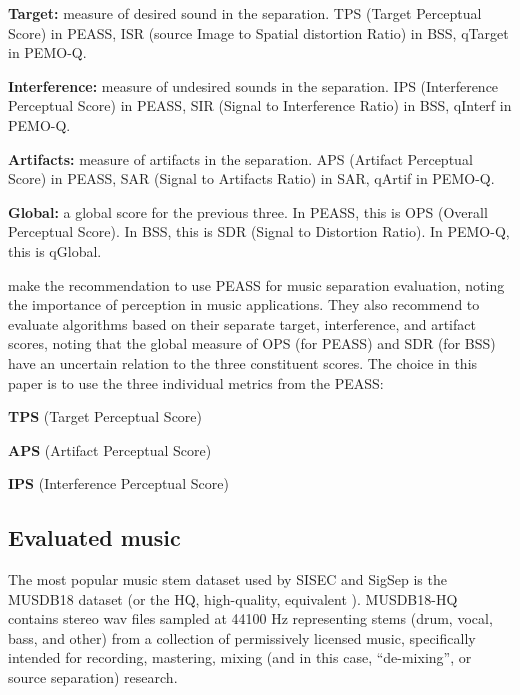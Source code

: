 \documentclass[letter,12pt]{article}
\newenvironment{tight_enumerate}{
\begin{enumerate}
  \setlength{\itemsep}{0pt}
  \setlength{\parskip}{0pt}
}{\end{enumerate}}
\newenvironment{tight_itemize}{
\begin{itemize}
  \setlength{\itemsep}{0pt}
  \setlength{\parskip}{0pt}
}{\end{itemize}}
\begin{document}
\begin{tight_itemize}
\item
	\textbf{Target:} measure of desired sound in the separation. TPS (Target Perceptual Score) in PEASS, ISR (source Image to Spatial distortion Ratio) in BSS, qTarget in PEMO-Q.
\item
	\textbf{Interference:} measure of undesired sounds in the separation. IPS (Interference Perceptual Score) in PEASS, SIR (Signal to Interference Ratio) in BSS, qInterf in PEMO-Q.
\item
	\textbf{Artifacts:} measure of artifacts in the separation. APS (Artifact Perceptual Score) in PEASS, SAR (Signal to Artifacts Ratio) in SAR, qArtif in PEMO-Q.
\item
	\textbf{Global:} a global score for the previous three. In PEASS, this is OPS (Overall Perceptual Score). In BSS, this is SDR (Signal to Distortion Ratio). In PEMO-Q, this is qGlobal.
\end{tight_itemize}

\citet{beassvpeass} make the recommendation to use PEASS for music separation evaluation, noting the importance of perception in music applications. They also recommend to evaluate algorithms based on their separate target, interference, and artifact scores, noting that the global measure of OPS (for PEASS) and SDR (for BSS) have an uncertain relation to the three constituent scores. The choice in this paper is to use the three individual metrics from the PEASS:
\begin{tight_enumerate}
	\item
		\textbf{TPS} (Target Perceptual Score)
	\item
		\textbf{APS} (Artifact Perceptual Score)
	\item
		\textbf{IPS} (Interference Perceptual Score)
\end{tight_enumerate}

\subsection{Evaluated music}

The most popular music stem dataset used by SISEC and SigSep is the MUSDB18 dataset \cite{musdb18} (or the HQ, high-quality, equivalent \cite{musdb18-hq}). MUSDB18-HQ contains stereo wav files sampled at 44100 Hz representing stems (drum, vocal, bass, and other) from a collection of permissively licensed music, specifically intended for recording, mastering, mixing (and in this case, ``de-mixing'', or source separation) research. 
\end{document}
